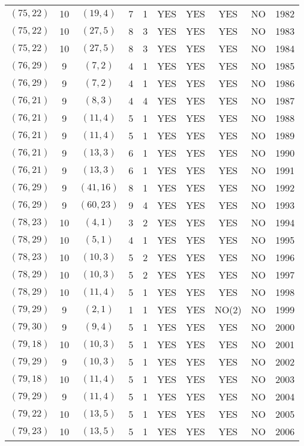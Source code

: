 \begin{longtable}{|c|c|c|c|c|c|c|c|c|c|}
$(75, 22)$ & 10 & $(19, 4)$ & 7 & 1 & YES & YES & YES & NO & 1982\\
$(75, 22)$ & 10 & $(27, 5)$ & 8 & 3 & YES & YES & YES & NO & 1983\\
$(75, 22)$ & 10 & $(27, 5)$ & 8 & 3 & YES & YES & YES & NO & 1984\\
$(76, 29)$ & 9 & $(7, 2)$ & 4 & 1 & YES & YES & YES & NO & 1985\\
$(76, 29)$ & 9 & $(7, 2)$ & 4 & 1 & YES & YES & YES & NO & 1986\\
$(76, 21)$ & 9 & $(8, 3)$ & 4 & 4 & YES & YES & YES & NO & 1987\\
$(76, 21)$ & 9 & $(11, 4)$ & 5 & 1 & YES & YES & YES & NO & 1988\\
$(76, 21)$ & 9 & $(11, 4)$ & 5 & 1 & YES & YES & YES & NO & 1989\\
$(76, 21)$ & 9 & $(13, 3)$ & 6 & 1 & YES & YES & YES & NO & 1990\\
$(76, 21)$ & 9 & $(13, 3)$ & 6 & 1 & YES & YES & YES & NO & 1991\\
$(76, 29)$ & 9 & $(41, 16)$ & 8 & 1 & YES & YES & YES & NO & 1992\\
$(76, 29)$ & 9 & $(60, 23)$ & 9 & 4 & YES & YES & YES & NO & 1993\\
$(78, 23)$ & 10 & $(4, 1)$ & 3 & 2 & YES & YES & YES & NO & 1994\\
$(78, 29)$ & 10 & $(5, 1)$ & 4 & 1 & YES & YES & YES & NO & 1995\\
$(78, 23)$ & 10 & $(10, 3)$ & 5 & 2 & YES & YES & YES & NO & 1996\\
$(78, 29)$ & 10 & $(10, 3)$ & 5 & 2 & YES & YES & YES & NO & 1997\\
$(78, 29)$ & 10 & $(11, 4)$ & 5 & 1 & YES & YES & YES & NO & 1998\\
$(79, 29)$ & 9 & $(2, 1)$ & 1 & 1 & YES & YES & NO(2) & NO & 1999\\
$(79, 30)$ & 9 & $(9, 4)$ & 5 & 1 & YES & YES & YES & NO & 2000\\
$(79, 18)$ & 10 & $(10, 3)$ & 5 & 1 & YES & YES & YES & NO & 2001\\
$(79, 29)$ & 9 & $(10, 3)$ & 5 & 1 & YES & YES & YES & NO & 2002\\
$(79, 18)$ & 10 & $(11, 4)$ & 5 & 1 & YES & YES & YES & NO & 2003\\
$(79, 29)$ & 9 & $(11, 4)$ & 5 & 1 & YES & YES & YES & NO & 2004\\
$(79, 22)$ & 10 & $(13, 5)$ & 5 & 1 & YES & YES & YES & NO & 2005\\
$(79, 23)$ & 10 & $(13, 5)$ & 5 & 1 & YES & YES & YES & NO & 2006\\

\end{longtable}

